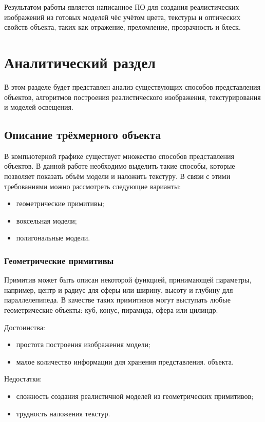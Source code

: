 \documentclass[12pt,a4paper,oneside]{report}
\begin{document}
    	Результатом работы является написанное ПО для создания реалистических изображений из готовых моделей чёс учётом цвета, текстуры и оптических свойств объекта, таких как отражение, преломление, прозрачность и блеск.
    \chapter{Аналитический раздел}
    	\quad В этом разделе будет представлен анализ существующих способов представления объектов, алгоритмов построения реалистического изображения, текстурирования и моделей освещения.
    \section{Описание трёхмерного объекта}
    	\quad В компьютерной графике существует множество способов представления объектов. В данной работе необходимо выделить такие способы, которые позволяет показать объём модели и наложить текстуру. В связи с этими требованиями можно рассмотреть следующие варианты:
    	\begin{itemize}
			\item геометрические примитивы;
    		\item воксельная модели;
    		\item полигональные модели.
    	\end{itemize}
    	\subsection{Геометрические примитивы}
    		\quad Примитив может быть описан некоторой функцией, принимающей параметры, например, центр и радиус для сферы или ширину, высоту и глубину для параллелепипеда. В качестве таких примитивов могут выступать любые геометрические объекты: куб, конус, пирамида, сфера или цилиндр.
    		
    		Достоинства:
    		\begin{itemize}
    			\item простота построения изображения модели;
    			\item малое количество информации для хранения представления. объекта.
    		\end{itemize}
    		
    		Недостатки:
    		\begin{itemize}
    			\item сложность создания реалистичной моделей из геометрических примитивов;
    			\item трудность наложения текстур.
    		\end{itemize}
\end{document}
